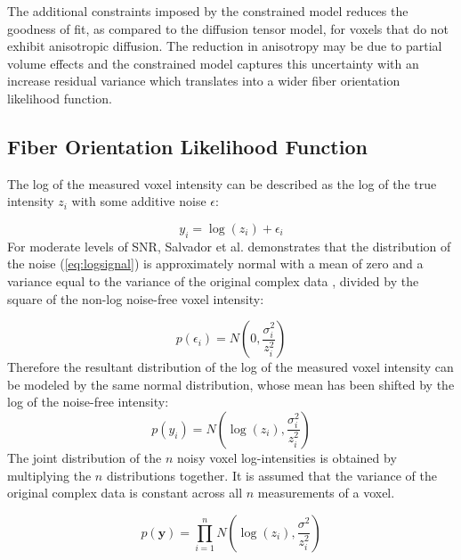 The additional constraints imposed by the constrained model reduces the goodness of fit, as compared to the diffusion tensor model, for voxels that do not exhibit anisotropic diffusion.  The reduction in anisotropy may be due to partial volume effects and the constrained model captures this uncertainty with an increase residual variance which translates into a wider fiber orientation likelihood function.

\subsection{Fiber Orientation Likelihood Function}

The log of the measured voxel intensity can be described as the log of the true intensity $z_i$ with some additive noise $\epsilon$:

\begin{equation} \label{eq:logsignal}
y_i = \log(z_i) + \epsilon_i
\end{equation}
%
%
For moderate levels of SNR, Salvador et al. \cite{salvador} demonstrates that the distribution of the noise (\ref{eq:logsignal}) is approximately normal with a mean of zero and a variance equal to the variance of the original complex data \cite{salvador}, divided by the square of the non-log noise-free voxel intensity:

\begin{equation} \label{eq:noisepdf}
p(\epsilon_i) = N \left( 0, \frac{\sigma_i^2}{z_i^2} \right)
\end{equation}
%
%
Therefore the resultant distribution of the log of the measured voxel intensity can be modeled by the same normal distribution, whose mean has been shifted by the log of the noise-free intensity:
\begin{equation} \label{eq:signalpdf}
p(y_i) = N\left( \log(z_i), \frac{\sigma_i^2}{z_i^2} \right)
\end{equation}
%
%
The joint distribution of the $n$ noisy voxel log-intensities is obtained by multiplying the $n$ distributions together.  It is assumed that the variance of the original complex data is constant across all $n$ measurements of a voxel.

\begin{equation} \label{eq:jointsignalpdf}
p(\mathbf{y}) = \prod_{i=1}^{n}N\left( \log(z_i), \frac{\sigma^2}{z_i^2} \right)
\end{equation}

